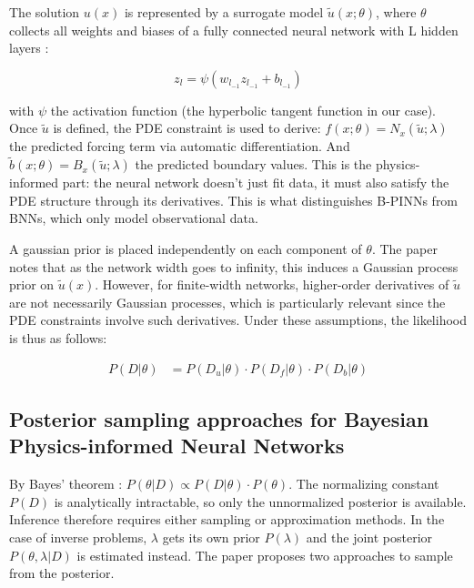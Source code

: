 \documentclass{article}
\begin{document}
The solution $u(x)$ is represented by a surrogate model $\tilde{u}(x; \theta)$, where $\theta$ collects all weights and biases of a fully connected neural network with L hidden layers : 

$$z_l = \psi(w_{l_{-1}} z_{l_{-1}} + b_{l_{-1}})$$

with $\psi$ the activation function (the hyperbolic tangent function in our case). Once $\tilde{u}$ is defined, the PDE constraint is used to derive: $f(x; \theta) = N_x(\tilde{u}; \lambda)$ the predicted forcing term via automatic differentiation. And $\tilde{b}(x; \theta) = B_x(\tilde{u}; \lambda)$ the predicted boundary values. This is the physics-informed part: the neural network doesn't just fit data, it must also satisfy the PDE structure through its derivatives. This is what distinguishes B-PINNs from BNNs, which only model observational data. 


A gaussian prior is placed independently on each component of $\theta$. The paper notes that as the network width goes to infinity, this induces a Gaussian process prior on $\tilde{u}(x)$. However, for finite-width networks, higher-order derivatives of $\tilde{u}$ are not necessarily Gaussian processes, which is particularly relevant since the PDE constraints involve such derivatives. Under these assumptions, the likelihood is thus as follows:

\begin{align*}
    P(D|\theta) &= P(D_u|\theta) · P(D_f|\theta) · P(D_b|\theta)
\end{align*}


\subsection{Posterior sampling approaches for Bayesian Physics-informed Neural Networks}
 
By Bayes' theorem : $P(\theta|D) \propto P(D|\theta) · P(\theta)$. The normalizing constant $P(D)$ is analytically intractable, so only the unnormalized posterior is available. Inference therefore requires either sampling or approximation methods. In the case of inverse problems, $\lambda$ gets its own prior $P(\lambda)$ and the joint posterior $P(\theta, \lambda|D)$ is estimated instead. The paper proposes two approaches to sample from the posterior.
\end{document}
